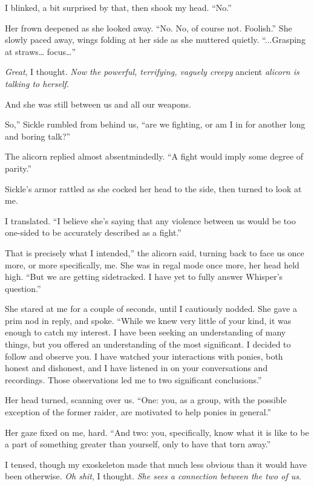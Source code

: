 I blinked, a bit surprised by that, then shook my head. “No.”

Her frown deepened as she looked away. “No. No, of course not. Foolish.” She slowly paced away, wings folding at her side as she muttered quietly. “...Grasping at straws… focus…”

\textit{Great}, I thought. \textit{Now the powerful, terrifying, vaguely creepy }ancient\textit{ alicorn is talking to herself.}

And she was still between us and all our weapons.

\leavevmode{}So,” Sickle rumbled from behind us, “are we fighting, or am I in for another long and boring talk?”

The alicorn replied almost absentmindedly. “A fight would imply some degree of parity.”

Sickle’s armor rattled as she cocked her head to the side, then turned to look at me.

I translated. “I believe she’s saying that any violence between us would be too one-sided to be accurately described as a fight.”

\leavevmode{}That is precisely what I intended,” the alicorn said, turning back to face us once more, or more specifically, me. She was in regal mode once more, her head held high. “But we are getting sidetracked. I have yet to fully answer Whisper’s question.”

She stared at me for a couple of seconds, until I cautiously nodded. She gave a prim nod in reply, and spoke. “While we knew very little of your kind, it was enough to catch my interest. I have been seeking an understanding of many things, but you offered an understanding of the most significant. I decided to follow and observe you. I have watched your interactions with ponies, both honest and dishonest, and I have listened in on your conversations and recordings. Those observations led me to two significant conclusions.”

Her head turned, scanning over us. “One: you, as a group, with the possible exception of the former raider, are motivated to help ponies in general.”

Her gaze fixed on me, hard. “And two: you, specifically, know what it is like to be a part of something greater than yourself, only to have that torn away.”

I tensed, though my exoskeleton made that much less obvious than it would have been otherwise. \textit{Oh shit}, I thought. \textit{She sees a connection between the two of us}.

